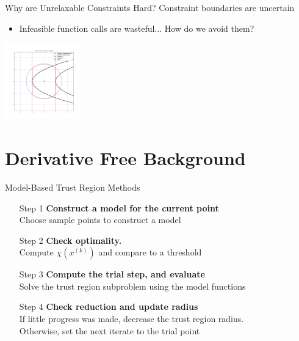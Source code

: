 \documentclass{beamer}
\newcommand{\xk}{{{x}^{(k)}}}
\begin{document}
\begin{frame}{Why are Unrelaxable Constraints Hard?}
	Constraint boundaries are uncertain
	\begin{itemize}
		\item Infeasible function calls are wasteful... How do we avoid them?
	\end{itemize}
	\begin{center}
		\includegraphics[width=125px]{images/modeled_constraints.png}
	\end{center}
\end{frame}




\section{Derivative Free Background}


\begin{frame}{Model-Based Trust Region Methods}
	\begin{itemize}
		\item[Step 1] \textbf{Construct a model for the current point} \\
			Choose sample points to construct a model
		\item[Step 2] \textbf{Check optimality.} \\
			Compute $\chi\left(\xk\right)$ and compare to a threshold
		\item[Step 3] \textbf{Compute the trial step, and evaluate} \\
			Solve the trust region subproblem using the model functions
		\item[Step 4] \textbf{Check reduction and update radius} \\
			If little progress was made, decrease the trust region radius. \\
			Otherwise, set the next iterate to the trial point
	\end{itemize}
\end{frame}
\end{document}
